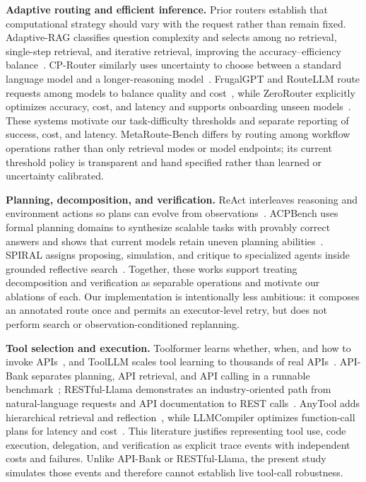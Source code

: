 \documentclass[sigconf]{acmart}
\begin{document}
\textbf{Adaptive routing and efficient inference.} Prior routers establish that computational strategy should vary with the request rather than remain fixed. Adaptive-RAG classifies question complexity and selects among no retrieval, single-step retrieval, and iterative retrieval, improving the accuracy--efficiency balance~\cite{jeong2024adaptiverag}. CP-Router similarly uses uncertainty to choose between a standard language model and a longer-reasoning model~\cite{su2026cprouter}. FrugalGPT and RouteLLM route requests among models to balance quality and cost~\cite{chen2024frugalgpt,ong2025routellm}, while ZeroRouter explicitly optimizes accuracy, cost, and latency and supports onboarding unseen models~\cite{yan2026zerorouter}. These systems motivate our task-difficulty thresholds and separate reporting of success, cost, and latency. MetaRoute-Bench differs by routing among workflow operations rather than only retrieval modes or model endpoints; its current threshold policy is transparent and hand specified rather than learned or uncertainty calibrated.

\textbf{Planning, decomposition, and verification.} ReAct interleaves reasoning and environment actions so plans can evolve from observations~\cite{yao2023react}. ACPBench uses formal planning domains to synthesize scalable tasks with provably correct answers and shows that current models retain uneven planning abilities~\cite{kokel2025acpbench}. SPIRAL assigns proposing, simulation, and critique to specialized agents inside grounded reflective search~\cite{zhang2026spiral}. Together, these works support treating decomposition and verification as separable operations and motivate our ablations of each. Our implementation is intentionally less ambitious: it composes an annotated route once and permits an executor-level retry, but does not perform search or observation-conditioned replanning.

\textbf{Tool selection and execution.} Toolformer learns whether, when, and how to invoke APIs~\cite{schick2023toolformer}, and ToolLLM scales tool learning to thousands of real APIs~\cite{qin2024toolllm}. API-Bank separates planning, API retrieval, and API calling in a runnable benchmark~\cite{li2023apibank}; RESTful-Llama demonstrates an industry-oriented path from natural-language requests and API documentation to REST calls~\cite{xu2024restful}. AnyTool adds hierarchical retrieval and reflection~\cite{du2024anytool}, while LLMCompiler optimizes function-call plans for latency and cost~\cite{kim2024llmcompiler}. This literature justifies representing tool use, code execution, delegation, and verification as explicit trace events with independent costs and failures. Unlike API-Bank or RESTful-Llama, the present study simulates those events and therefore cannot establish live tool-call robustness.
\end{document}
